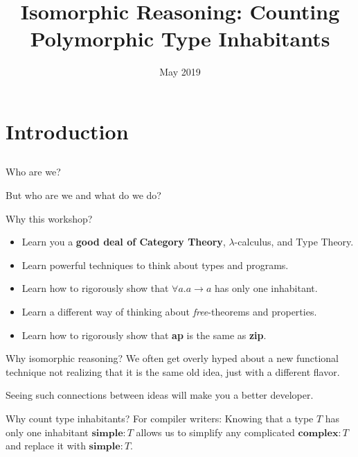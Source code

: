 \documentclass[tikz]{beamer}
\title{Isomorphic Reasoning: Counting Polymorphic Type Inhabitants}
\author{}
\date{May 2019}
\theoremstyle{definition}
\begin{document}
\maketitle

\section{Introduction}
\subsection{}

\begin{frame}{Who are we?}

But who are we and what do we do?

\end{frame}

\begin{frame}{Why this workshop?}
\begin{itemize}
    \item Learn you a \textbf{good deal of Category Theory}, $\lambda$-calculus, and Type Theory.
    \item Learn powerful techniques to think about types and programs.
    \item Learn how to rigorously show that $\forall a. a \rightarrow a$ has only one inhabitant.
    \item Learn a different way of thinking about \textit{free}-theorems and properties.
    \item Learn how to rigorously show that \textbf{ap} is the same as \textbf{zip}.
\end{itemize}
\end{frame}

\begin{frame}{Why isomorphic reasoning?}
We often get overly hyped about a new functional technique not realizing that it is the same old idea, just with a different flavor.

Seeing such connections between ideas will make you a better developer.
\end{frame}

\begin{frame}{Why count type inhabitants?}
For compiler writers: Knowing that a type $T$ has only one inhabitant $\textbf{simple} : T$ allows us to simplify any complicated $\textbf{complex} : T$ and replace it with $\textbf{simple} : T$.
\end{frame}
\end{document}
